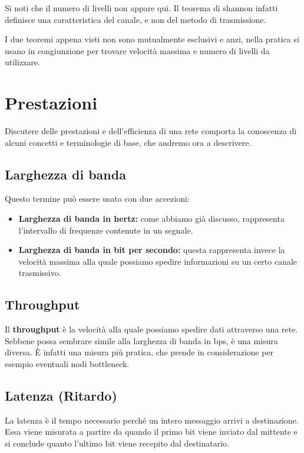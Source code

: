         Si noti che il numero di livelli non appare qui. Il teorema di shannon infatti definisce una caratteristica del canale, e non del metodo di trasmissione.
        
        I due teoremi appena visti non sono mutualmente esclusivi e anzi, nella pratica si usano in congiunzione per trovare velocità massima e numero di livelli da utilizzare.
        
\section{Prestazioni}
    Discutere delle prestazioni e dell'efficienza di una rete comporta la conoscenza di alcuni concetti e terminologie di base, che andremo ora a descrivere.
    
    \subsection{Larghezza di banda}
        Questo termine può essere usato con due accezioni:
        \begin{itemize}
            \item \textbf{Larghezza di banda in hertz:} come abbiamo già discusso, rappresenta l'intervallo di frequenze contenute in un segnale.
            
            \item \textbf{Larghezza di banda in bit per secondo:} questa rappresenta invece la velocità massima alla quale possiamo spedire informazioni su un certo canale trasmissivo.
        \end{itemize}
        
    \subsection{Throughput}
        Il \textbf{throughput} è la velocità alla quale possiamo spedire dati attraverso una rete. Sebbene possa sembrare simile alla larghezza di banda in bps, è una misura diversa. È infatti una misura più pratica, che prende in considerazione per esempio eventuali nodi bottleneck.
        
    \subsection{Latenza (Ritardo)}
        La latenza è il tempo necessario perché un intero messaggio arrivi a destinazione. Essa viene misurata a partire da quando il primo bit viene inviato dal mittente e si conclude quanto l'ultimo bit viene recepito dal destinatario.
        
